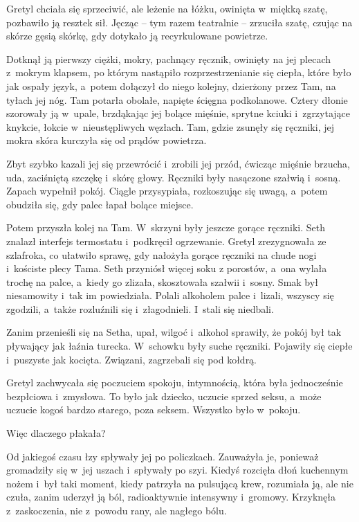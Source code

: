 \documentclass[oneside,polish,11pt,sfheadings]{mwbk}
\begin{document}
Gretyl chciała się sprzeciwić, ale leżenie na łóżku, owinięta w~miękką
szatę, pozbawiło ją resztek sił. Jęcząc -- tym razem teatralnie -- zrzuciła szatę, czując na skórze gęsią skórkę, gdy dotykało ją
recyrkulowane powietrze.

Dotknął ją pierwszy ciężki, mokry, pachnący ręcznik, owinięty na jej
plecach z~mokrym klapsem, po którym nastąpiło rozprzestrzenianie się
ciepła, które było jak ospały język, a~potem dołączył do niego kolejny,
dzierżony przez Tam, na tyłach jej nóg. Tam potarła obolałe, napięte
ścięgna podkolanowe. Cztery dłonie szorowały ją w~upale, brzdąkając jej
bolące mięśnie, sprytne kciuki i~zgrzytające knykcie, łokcie w~nieustępliwych węzłach. Tam, gdzie zsunęły się ręczniki, jej mokra skóra
kurczyła się od prądów powietrza.

Zbyt szybko kazali jej się przewrócić i~zrobili jej przód, ćwicząc
mięśnie brzucha, uda, zaciśniętą szczękę i~skórę głowy. Ręczniki były
nasączone szałwią i~sosną. Zapach wypełnił pokój. Ciągle przysypiała,
rozkoszując się uwagą, a~potem obudziła się, gdy palec łapał bolące
miejsce.

Potem przyszła kolej na Tam. W~skrzyni były jeszcze gorące ręczniki.
Seth znalazł interfejs termostatu i~podkręcił ogrzewanie. Gretyl
zrezygnowała ze szlafroka, co ułatwiło sprawę, gdy nałożyła gorące
ręczniki na chude nogi i~kościste plecy Tama. Seth przyniósł więcej soku
z porostów, a~ona wylała trochę na palce, a~kiedy go zlizała,
skosztowała szałwii i~sosny. Smak był niesamowity i~tak im powiedziała.
Polali alkoholem palce i~lizali, wszyscy się zgodzili, a~także
rozluźnili się i~złagodnieli. I~stali się niedbali.

Zanim przenieśli się na Setha, upał, wilgoć i~alkohol sprawiły, że pokój
był tak pływający jak łaźnia turecka. W~schowku były suche ręczniki.
Pojawiły się ciepłe i~puszyste jak kocięta. Związani, zagrzebali się pod
kołdrą.

Gretyl zachwycała się poczuciem spokoju, intymnością, która była
jednocześnie bezpłciowa i~zmysłowa. To było jak dziecko, uczucie sprzed
seksu, a~może uczucie kogoś bardzo starego, poza seksem. Wszystko było w~pokoju.

Więc dlaczego płakała?

Od jakiegoś czasu łzy spływały jej po policzkach. Zauważyła je, ponieważ
gromadziły się w~jej uszach i~spływały po szyi. Kiedyś rozcięła dłoń
kuchennym nożem i~był taki moment, kiedy patrzyła na pulsującą krew,
rozumiała ją, ale nie czuła, zanim uderzył ją ból, radioaktywnie
intensywny i~gromowy. Krzyknęła z~zaskoczenia, nie z~powodu rany, ale
nagłego bólu.
\end{document}
